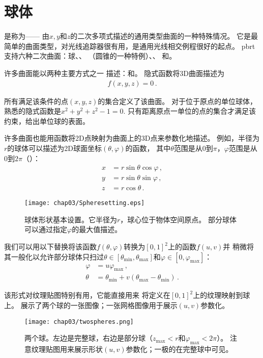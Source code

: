 \section{球体}\label{sec:球体}

是称为——
由$x,y$和$z$的二次多项式描述的通用类型曲面的一种特殊情况。
它是最简单的曲面类型，对光线追踪器很有用，是通用光线相交例程很好的起点。
pbrt支持六种二次曲面：球、、
（圆锥的一种特例）、、
和。

许多曲面能以两种主要方式之一
描述：和。
隐式函数将3D曲面描述为
\begin{align*}
    f(x,y,z)=0\, .
\end{align*}

所有满足该条件的点$(x,y,z)$的集合定义了该曲面。
对于位于原点的单位球体，熟悉的隐式函数是$x^2+y^2+z^2-1=0$.
只有距离原点一单位的点的集合才满足该约束，给出单位球的表面。

许多曲面也能用函数将2D点映射为曲面上的3D点来参数化地描述。
例如，半径为$r$的球体可以描述为2D球面坐标$(\theta,\varphi)$的函数，
其中$\theta$范围是从$0$到$\pi$，$\varphi$范围是从$0$到$2\pi$（）：
\begin{align*}
    x & =r\sin\theta\cos\varphi\, , \\
    y & =r\sin\theta\sin\varphi\, , \\
    z & =r\cos\theta\, .
\end{align*}
\begin{figure}[htbp]
    \centering\texttt{[image: chap03/Spheresetting.eps]}
    \caption{球体形状基本设置。它半径为$r$，球心位于物体空间原点。
        部分球体可以通过指定$\varphi$的最大值描述。}
    \label{fig:3.4}
\end{figure}

我们可以用以下替换将该函数$f(\theta,\varphi)$转换为$[0,1]^2$上的函数$f(u,v)$并
稍微将其一般化以允许部分球体只扫过$\theta\in[\theta_{\min},\theta_{\max}]$和$\varphi\in[0,\varphi_{\max}]$：
\begin{align*}
    \varphi & =u\varphi_{\max}\, ,                              \\
    \theta  & =\theta_{\min}+v(\theta_{\max}-\theta_{\min})\, .
\end{align*}

该形式对纹理贴图特别有用，它能直接用来
将定义在$[0,1]^2$上的纹理映射到球上。
展示了两个球的一张图像；一张网格图像用于展示$(u,v)$参数化。
\begin{figure}[htbp]
    \centering\texttt{[image: chap03/twospheres.png]}
    \caption{两个球。左边是完整球，右边是部分球（$z_{\max}<r$和$\varphi_{\max}<2\pi$）。
        注意纹理贴图用来展示形状$(u,v)$参数化；一极的\protect{}在完整球中可见。}
    \label{fig:3.5}
\end{figure}

